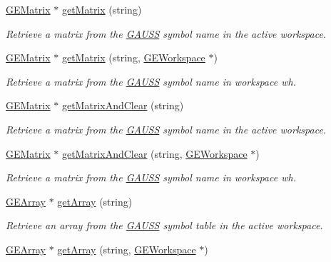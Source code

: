 \begin{DoxyCompactItemize}
\hyperlink{class_g_e_matrix}{G\-E\-Matrix} $\ast$ \hyperlink{class_g_a_u_s_s_a7c2716d0bb1c2cdca5de3f74b89f045a}{get\-Matrix} (string)
\begin{DoxyCompactList}\small\item\em Retrieve a matrix from the \hyperlink{class_g_a_u_s_s}{G\-A\-U\-S\-S} symbol name in the active workspace. \end{DoxyCompactList}\item 
\hyperlink{class_g_e_matrix}{G\-E\-Matrix} $\ast$ \hyperlink{class_g_a_u_s_s_a760da892985076d0f595da7eb88a07fe}{get\-Matrix} (string, \hyperlink{class_g_e_workspace}{G\-E\-Workspace} $\ast$)
\begin{DoxyCompactList}\small\item\em Retrieve a matrix from the \hyperlink{class_g_a_u_s_s}{G\-A\-U\-S\-S} symbol name in workspace {\itshape wh}. \end{DoxyCompactList}\item 
\hyperlink{class_g_e_matrix}{G\-E\-Matrix} $\ast$ \hyperlink{class_g_a_u_s_s_ae015bd236952146aa33ed7e3a279ff04}{get\-Matrix\-And\-Clear} (string)
\begin{DoxyCompactList}\small\item\em Retrieve a matrix from the \hyperlink{class_g_a_u_s_s}{G\-A\-U\-S\-S} symbol name in the active workspace. \end{DoxyCompactList}\item 
\hyperlink{class_g_e_matrix}{G\-E\-Matrix} $\ast$ \hyperlink{class_g_a_u_s_s_afdb5633bee38528f3a19ec92b5d9b2a5}{get\-Matrix\-And\-Clear} (string, \hyperlink{class_g_e_workspace}{G\-E\-Workspace} $\ast$)
\begin{DoxyCompactList}\small\item\em Retrieve a matrix from the \hyperlink{class_g_a_u_s_s}{G\-A\-U\-S\-S} symbol name in workspace {\itshape wh}. \end{DoxyCompactList}\item 
\hyperlink{class_g_e_array}{G\-E\-Array} $\ast$ \hyperlink{class_g_a_u_s_s_a4016aa13feb5c5648556dcca73caf030}{get\-Array} (string)
\begin{DoxyCompactList}\small\item\em Retrieve an array from the \hyperlink{class_g_a_u_s_s}{G\-A\-U\-S\-S} symbol table in the active workspace. \end{DoxyCompactList}\item 
\hyperlink{class_g_e_array}{G\-E\-Array} $\ast$ \hyperlink{class_g_a_u_s_s_ac674a4f382ee80691146d412c3182c1d}{get\-Array} (string, \hyperlink{class_g_e_workspace}{G\-E\-Workspace} $\ast$)

\end{DoxyCompactItemize}
